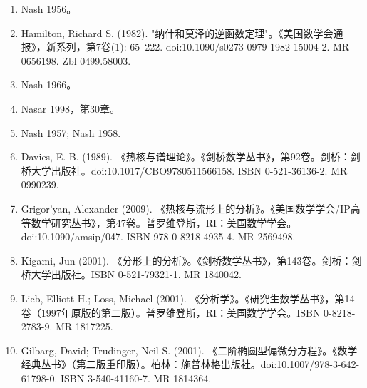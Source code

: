 \begin{enumerate}
\item Nash 1956。
\item Hamilton, Richard S. (1982). "纳什和莫泽的逆函数定理"。《美国数学会通报》，新系列，第7卷(1): 65–222. doi:10.1090/s0273-0979-1982-15004-2. MR 0656198. Zbl 0499.58003.
\item Nash 1966。
\item Nasar 1998，第30章。
\item Nash 1957; Nash 1958.
\item Davies, E. B. (1989). 《热核与谱理论》。《剑桥数学丛书》，第92卷。剑桥：剑桥大学出版社。doi:10.1017/CBO9780511566158. ISBN 0-521-36136-2. MR 0990239.
\item Grigor'yan, Alexander (2009). 《热核与流形上的分析》。《美国数学学会/IP高等数学研究丛书》，第47卷。普罗维登斯，RI：美国数学学会。doi:10.1090/amsip/047. ISBN 978-0-8218-4935-4. MR 2569498.
\item Kigami, Jun (2001). 《分形上的分析》。《剑桥数学丛书》，第143卷。剑桥：剑桥大学出版社。ISBN 0-521-79321-1. MR 1840042.
\item Lieb, Elliott H.; Loss, Michael (2001). 《分析学》。《研究生数学丛书》，第14卷（1997年原版的第二版）。普罗维登斯，RI：美国数学学会。ISBN 0-8218-2783-9. MR 1817225.
\item Gilbarg, David; Trudinger, Neil S. (2001). 《二阶椭圆型偏微分方程》。《数学经典丛书》（第二版重印版）。柏林：施普林格出版社。doi:10.1007/978-3-642-61798-0. ISBN 3-540-41160-7. MR 1814364.
\end{enumerate}